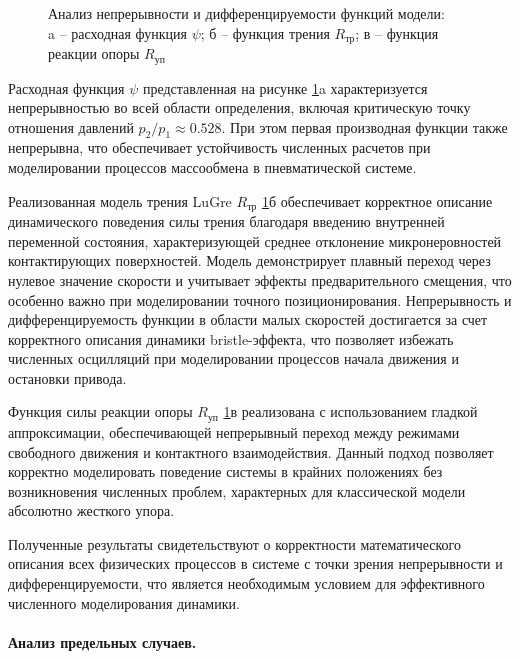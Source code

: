 \begin{figure}[ht]
    \caption{Анализ непрерывности и дифференцируемости функций модели:\\ a -- расходная функция $\psi$; б -- функция трения $R_\text{тр}$; в -- функция реакции опоры $R_\text{уп}$}
    \label{fig:ch2/continuity_analysis}
\end{figure}

Расходная функция $\psi$ представленная на рисунке \ref{fig:ch2/continuity_analysis}a характеризуется непрерывностью во
всей области определения, включая критическую точку отношения давлений $p_2/p_1 \approx \num{0.528}$. При этом первая производная
функции также непрерывна, что обеспечивает устойчивость численных расчетов при моделировании процессов массообмена в пневматической системе.

Реализованная модель трения LuGre $R_\text{тр}$ \ref{fig:ch2/continuity_analysis}б обеспечивает корректное описание
динамического поведения силы трения благодаря введению внутренней переменной состояния, характеризующей среднее
отклонение микронеровностей контактирующих поверхностей. Модель демонстрирует плавный переход через нулевое
значение скорости и учитывает эффекты предварительного смещения, что особенно важно при моделировании точного позиционирования. Непрерывность
и дифференцируемость функции в области малых скоростей достигается за счет корректного описания
динамики bristle-эффекта, что позволяет избежать численных осцилляций при моделировании процессов начала движения и остановки привода.

Функция силы реакции опоры $R_\text{уп}$ \ref{fig:ch2/continuity_analysis}в реализована с использованием гладкой аппроксимации,
обеспечивающей непрерывный переход между режимами свободного движения и контактного взаимодействия.
Данный подход позволяет корректно моделировать поведение системы в крайних положениях без возникновения
численных проблем, характерных для классической модели абсолютно жесткого упора.

Полученные результаты свидетельствуют о корректности математического описания всех
физических процессов в системе с точки зрения непрерывности и дифференцируемости, что является
необходимым условием для эффективного численного моделирования динамики. 

\paragraph{Анализ предельных случаев.}

